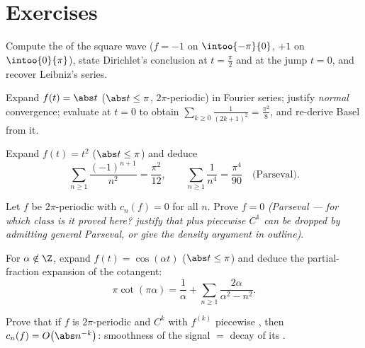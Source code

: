 \section{Exercises}

\begin{exercise}[$\star$]\label{exo:b2:fourier:1}
Compute the  of the square wave ($f = -1$ on
$\intoo{-\pi}{0}$, $+1$ on $\intoo{0}{\pi}$), state Dirichlet's
conclusion at $t = \frac\pi2$ and at the jump $t = 0$, and recover
Leibniz's series.
\end{exercise}

\begin{exercise}[$\star$]\label{exo:b2:fourier:2}
Expand $f(t) = \abs t$ ($\abs t \leq \pi$, $2\pi$-periodic) in
Fourier series; justify \emph{normal} convergence; evaluate at $t =
0$ to obtain $\sum_{k\geq0}\frac{1}{(2k+1)^2} = \frac{\pi^2}{8}$,
and re-derive Basel from it.
\end{exercise}

\begin{exercise}[$\star$]\label{exo:b2:fourier:3}
Expand $f(t) = t^2$ ($\abs t \leq \pi$) and deduce
\[
\sum_{n\geq1}\frac{(-1)^{n+1}}{n^2} = \frac{\pi^2}{12},
\qquad
\sum_{n\geq1}\frac{1}{n^4} = \frac{\pi^4}{90}
\quad\text{(Parseval)}.
\]
\end{exercise}

\begin{exercise}[$\star\star$]\label{exo:b2:fourier:4}
Let $f$ be  $2\pi$-periodic with $c_n(f) = 0$ for all
$n$. Prove $f = 0$ \emph{(Parseval --- for which class is it proved
here? justify that  plus piecewise $C^1$ can be dropped
by admitting general Parseval, or give the density argument in
outline)}.
\end{exercise}

\begin{exercise}[$\star\star$]\label{exo:b2:fourier:5}
For $\alpha \notin \Z$, expand $f(t) = \cos(\alpha t)$ ($\abs t
\leq \pi$) and deduce the partial-fraction expansion of the
cotangent:
\[
\pi\cot(\pi\alpha) = \frac{1}{\alpha} + \sum_{n\geq1}
\frac{2\alpha}{\alpha^2 - n^2} .
\]
\end{exercise}

\begin{exercise}[$\star\star$]\label{exo:b2:fourier:6}
Prove that if $f$ is $2\pi$-periodic and $C^k$ with $f^{(k)}$
piecewise , then $c_n(f) = O\bigl(\abs n^{-k}\bigr)$:
smoothness of the signal $=$ decay of its .
\end{exercise}

